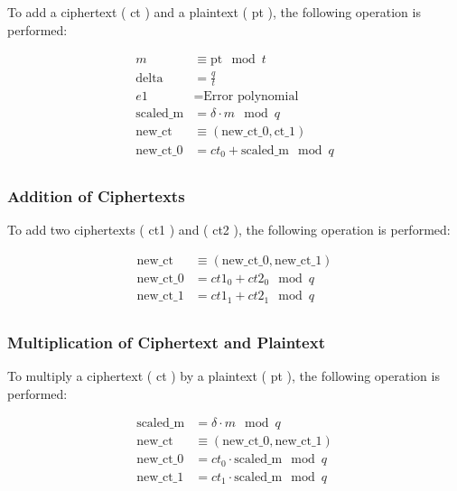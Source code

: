 To add a ciphertext ( ct ) and a plaintext ( pt ), the following
operation is performed:

\[
\begin{align*}
m &\equiv \text{pt} \mod t \\
\text{delta} &= \frac{q}{t} \\
e1 &= \text{Error polynomial} \\
\text{scaled\_m} &= \delta \cdot m \mod q \\
\text{new\_ct} &\equiv (\text{new\_ct\_0}, \text{ct\_1}) \\
\text{new\_ct\_0} &= ct_0 + \text{scaled\_m} \mod q \\
\end{align*}
\]

\hypertarget{addition-of-ciphertexts}{%
\subsubsection{Addition of Ciphertexts}\label{addition-of-ciphertexts}}

To add two ciphertexts ( ct1 ) and ( ct2 ), the following operation is
performed:

\[
\begin{align*}
\text{new\_ct} &\equiv (\text{new\_ct\_0}, \text{new\_ct\_1}) \\
\text{new\_ct\_0} &= ct1_0 + ct2_0 \mod q \\
\text{new\_ct\_1} &= ct1_1 + ct2_1 \mod q \\
\end{align*}
\]

\hypertarget{multiplication-of-ciphertext-and-plaintext}{%
\subsubsection{Multiplication of Ciphertext and
Plaintext}\label{multiplication-of-ciphertext-and-plaintext}}

To multiply a ciphertext ( ct ) by a plaintext ( pt ), the following
operation is performed:

\[
\begin{align*}
\text{scaled\_m} &= \delta \cdot m \mod q \\
\text{new\_ct} &\equiv (\text{new\_ct\_0}, \text{new\_ct\_1}) \\
\text{new\_ct\_0} &= ct_0 \cdot \text{scaled\_m} \mod q \\
\text{new\_ct\_1} &= ct_1 \cdot \text{scaled\_m} \mod q \\
\end{align*}
\]

